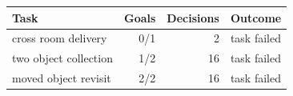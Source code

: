 \begin{tabular}{lrrl}
\toprule
Task & Goals & Decisions & Outcome \\
\midrule
cross room delivery & 0/1 & 2 & task failed \\
two object collection & 1/2 & 16 & task failed \\
moved object revisit & 2/2 & 16 & task failed \\
\bottomrule
\end{tabular}
